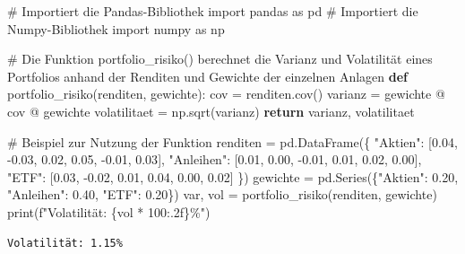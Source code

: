 \documentclass[
  ngerman,
  a4paper,
  DIV=11,
  oneside]{scrreprt}
\newenvironment{Shaded}{\begin{snugshade}}{\end{snugshade}}
\newcommand{\BuiltInTok}[1]{\textcolor[rgb]{0.00,0.23,0.31}{#1}}
\newcommand{\CommentTok}[1]{\textcolor[rgb]{0.37,0.37,0.37}{#1}}
\newcommand{\ControlFlowTok}[1]{\textcolor[rgb]{0.00,0.23,0.31}{\textbf{#1}}}
\newcommand{\DecValTok}[1]{\textcolor[rgb]{0.68,0.00,0.00}{#1}}
\newcommand{\FloatTok}[1]{\textcolor[rgb]{0.68,0.00,0.00}{#1}}
\newcommand{\ImportTok}[1]{\textcolor[rgb]{0.00,0.46,0.62}{#1}}
\newcommand{\KeywordTok}[1]{\textcolor[rgb]{0.00,0.23,0.31}{\textbf{#1}}}
\newcommand{\NormalTok}[1]{\textcolor[rgb]{0.00,0.23,0.31}{#1}}
\newcommand{\OperatorTok}[1]{\textcolor[rgb]{0.37,0.37,0.37}{#1}}
\newcommand{\SpecialCharTok}[1]{\textcolor[rgb]{0.37,0.37,0.37}{#1}}
\newcommand{\SpecialStringTok}[1]{\textcolor[rgb]{0.13,0.47,0.30}{#1}}
\newcommand{\StringTok}[1]{\textcolor[rgb]{0.13,0.47,0.30}{#1}}
\begin{document}
\begin{Shaded}
\begin{Highlighting}[]
\CommentTok{\# Importiert die Pandas{-}Bibliothek}
\ImportTok{import}\NormalTok{ pandas }\ImportTok{as}\NormalTok{ pd}
\CommentTok{\# Importiert die Numpy{-}Bibliothek}
\ImportTok{import}\NormalTok{ numpy }\ImportTok{as}\NormalTok{ np}

\CommentTok{\# Die Funktion portfolio\_risiko() berechnet die Varianz und Volatilität eines Portfolios anhand der Renditen und Gewichte der einzelnen Anlagen}
\KeywordTok{def}\NormalTok{ portfolio\_risiko(renditen, gewichte):}
\NormalTok{    cov }\OperatorTok{=}\NormalTok{ renditen.cov()}
\NormalTok{    varianz }\OperatorTok{=}\NormalTok{ gewichte }\OperatorTok{@}\NormalTok{ cov }\OperatorTok{@}\NormalTok{ gewichte}
\NormalTok{    volatilitaet }\OperatorTok{=}\NormalTok{ np.sqrt(varianz)}
    \ControlFlowTok{return}\NormalTok{ varianz, volatilitaet}

\CommentTok{\# Beispiel zur Nutzung der Funktion}
\NormalTok{renditen }\OperatorTok{=}\NormalTok{ pd.DataFrame(\{}
    \StringTok{"Aktien"}\NormalTok{: [}\FloatTok{0.04}\NormalTok{, }\OperatorTok{{-}}\FloatTok{0.03}\NormalTok{, }\FloatTok{0.02}\NormalTok{, }\FloatTok{0.05}\NormalTok{, }\OperatorTok{{-}}\FloatTok{0.01}\NormalTok{, }\FloatTok{0.03}\NormalTok{],}
    \StringTok{"Anleihen"}\NormalTok{: [}\FloatTok{0.01}\NormalTok{, }\FloatTok{0.00}\NormalTok{, }\OperatorTok{{-}}\FloatTok{0.01}\NormalTok{, }\FloatTok{0.01}\NormalTok{, }\FloatTok{0.02}\NormalTok{, }\FloatTok{0.00}\NormalTok{],}
    \StringTok{"ETF"}\NormalTok{: [}\FloatTok{0.03}\NormalTok{, }\OperatorTok{{-}}\FloatTok{0.02}\NormalTok{, }\FloatTok{0.01}\NormalTok{, }\FloatTok{0.04}\NormalTok{, }\FloatTok{0.00}\NormalTok{, }\FloatTok{0.02}\NormalTok{]}
\NormalTok{\})}
\NormalTok{gewichte }\OperatorTok{=}\NormalTok{ pd.Series(\{}\StringTok{"Aktien"}\NormalTok{: }\FloatTok{0.20}\NormalTok{, }\StringTok{"Anleihen"}\NormalTok{: }\FloatTok{0.40}\NormalTok{, }\StringTok{"ETF"}\NormalTok{: }\FloatTok{0.20}\NormalTok{\})}
\NormalTok{var, vol }\OperatorTok{=}\NormalTok{ portfolio\_risiko(renditen, gewichte)}
\BuiltInTok{print}\NormalTok{(}\SpecialStringTok{f"Volatilität: }\SpecialCharTok{\{}\NormalTok{vol }\OperatorTok{*} \DecValTok{100}\SpecialCharTok{:.2f\}}\SpecialStringTok{\%"}\NormalTok{)}
\end{Highlighting}
\end{Shaded}

\begin{verbatim}
Volatilität: 1.15%
\end{verbatim}
\end{document}
